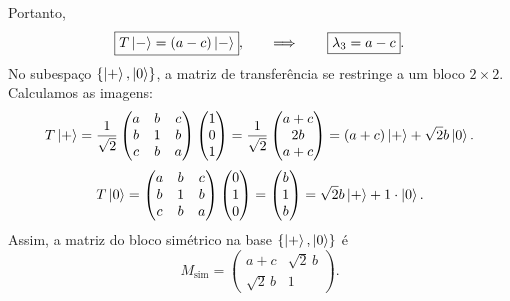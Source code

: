 \documentclass[11pt,a4paper]{article}
\begin{document}
%
Portanto,
%
\begin{equation}
    \boxed{T \ket{-} = (a - c) \ket{-}},
    \qquad \Longrightarrow \qquad
    \boxed{\lambda_3 = a - c}.
\end{equation}
%
No subespaço \(\{\ket{+}, \ket{0}\}\), a matriz de transferência se restringe a um bloco \(2 \times 2\). Calculamos as imagens:
%
\begin{equation}
    T \ket{+}
    =
    \frac{1}{\sqrt{2}}
    \begin{pmatrix}
        a & b & c \\
        b & 1 & b \\
        c & b & a
    \end{pmatrix}
    \begin{pmatrix} 1 \\ 0 \\ 1 \end{pmatrix}
    =
    \frac{1}{\sqrt{2}}
    \begin{pmatrix}
        a + c \\
        2b \\
        a + c
    \end{pmatrix}
    =
    (a+c) \ket{+} + \sqrt{2} b \ket{0}.
\end{equation}
%
\begin{equation}
    T \ket{0}
    =
    \begin{pmatrix}
        a & b & c \\
        b & 1 & b \\
        c & b & a
    \end{pmatrix}
    \begin{pmatrix} 0 \\ 1 \\ 0 \end{pmatrix}
    =
    \begin{pmatrix}
        b \\
        1 \\
        b
    \end{pmatrix}
    =
    \sqrt{2} b \ket{+} + 1 \cdot \ket{0}.
\end{equation}
%
Assim, a matriz do bloco simétrico na base \(\{\ket{+}, \ket{0}\}\) é
%
\begin{equation}
    M_{\text{sim}} =
    \begin{pmatrix}
        a + c & \sqrt{2}\, b \\
        \sqrt{2}\, b & 1
    \end{pmatrix}.
    \label{eq:M_sim}
\end{equation}
\end{document}
